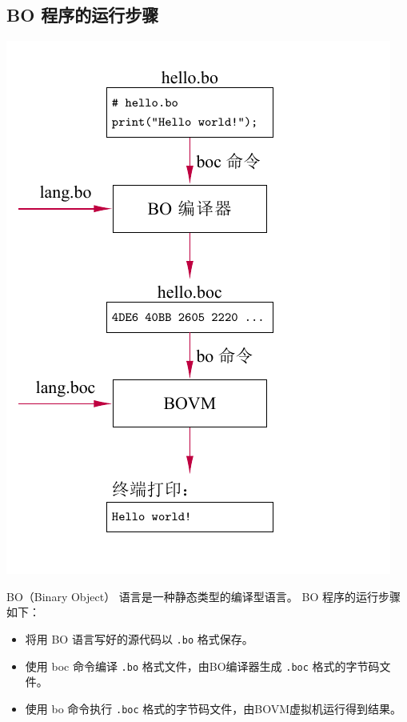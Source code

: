 \documentclass[dvipsnames, svgnames, x11names]{beamer}
\begin{document}
\subsection{BO 程序的运行步骤}
\begin{frame}
    \begin{minipage}{.4\linewidth}
    \includegraphics[height=\textheight]{../figure/compileProcess(1).pdf}
    \end{minipage}
    \quad\quad
    \begin{minipage}{.5\linewidth}
    \onslide<+-> BO（Binary Object） 语言是一种静态类型的编译型语言。
    \onslide<+-> BO 程序的运行步骤如下：
    \begin{itemize}[<+->]
        \item 将用 BO 语言写好的源代码以 \texttt{.bo} 格式保存。
        \item 使用 \alert{boc} 命令编译 \texttt{.bo} 格式文件，由BO编译器生成 \texttt{.boc} 格式的字节码文件。
        \item 使用 \alert{bo} 命令执行 \texttt{.boc} 格式的字节码文件，由BOVM虚拟机运行得到结果。
    \end{itemize}
    \end{minipage}
\end{frame}
\end{document}
